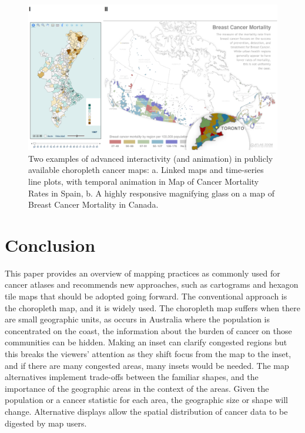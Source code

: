 \documentclass{monashthesis}
\begin{document}
\begin{figure}

{\centering \includegraphics[width=1\linewidth]{figures/02-literature/animating} 

}

\caption{Two examples of advanced interactivity (and animation) in publicly available choropleth cancer maps: a. Linked maps and time-series line plots, with temporal animation in Map of Cancer Mortality Rates in Spain, b. A highly responsive magnifying glass on a map of Breast Cancer Mortality in Canada.}\label{fig:animating}
\end{figure}

\hypertarget{conclusion-02}{%
\section{Conclusion}\label{conclusion-02}}

This paper provides an overview of mapping practices as commonly used for cancer atlases and recommends new approaches, such as cartograms and hexagon tile maps that should be adopted going forward. The conventional approach is the choropleth map, and it is widely used. The choropleth map suffers when there are small geographic units, as occurs in Australia where the population is concentrated on the coast, the information about the burden of cancer on those communities can be hidden. Making an inset can clarify congested regions but this breaks the viewers' attention as they shift focus from the map to the inset, and if there are many congested areas, many insets would be needed. The map alternatives implement trade-offs between the familiar shapes, and the importance of the geographic areas in the context of the areas. Given the population or a cancer statistic for each area, the geographic size or shape will change. Alternative displays allow the spatial distribution of cancer data to be digested by map users.
\end{document}
